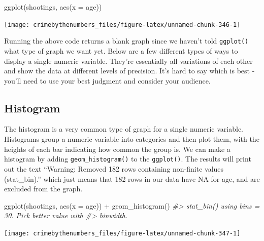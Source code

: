 \documentclass[
]{krantz}
\makeatletter
\newenvironment{Shaded}{\begin{snugshade}}{\end{snugshade}}
\newcommand{\AttributeTok}[1]{\textcolor[rgb]{0.61,0.61,0.61}{#1}}
\newcommand{\CommentTok}[1]{\textcolor[rgb]{0.37,0.37,0.37}{\textit{#1}}}
\newcommand{\FunctionTok}[1]{\textcolor[rgb]{0,0,0}{#1}}
\newcommand{\NormalTok}[1]{#1}
\newcommand{\SpecialCharTok}[1]{\textcolor[rgb]{0,0,0}{#1}}
\newenvironment{kframe}{%
\medskip{}
\setlength{\fboxsep}{.8em}
 \def\at@end@of@kframe{}%
 \ifinner\ifhmode%
  \def\at@end@of@kframe{\end{minipage}}%
  \begin{minipage}{\columnwidth}%
 \fi\fi%
 \def\FrameCommand##1{\hskip\@totalleftmargin \hskip-\fboxsep
 \colorbox{shadecolor}{##1}\hskip-\fboxsep
     \hskip-\linewidth \hskip-\@totalleftmargin \hskip\columnwidth}%
 \MakeFramed {\advance\hsize-\width
   \@totalleftmargin\z@ \linewidth\hsize
   \@setminipage}}%
 {\par\unskip\endMakeFramed%
 \at@end@of@kframe}
\renewenvironment{Shaded}{\begin{kframe}}{\end{kframe}}
\makeatother
\begin{document}
\begin{Shaded}
\begin{Highlighting}[]
\FunctionTok{ggplot}\NormalTok{(shootings, }\FunctionTok{aes}\NormalTok{(}\AttributeTok{x =}\NormalTok{ age))}
\end{Highlighting}
\end{Shaded}

\begin{center}\texttt{[image: crimebythenumbers\_files/figure-latex/unnamed-chunk-346-1]} \end{center}

Running the above code returns a blank graph since we
haven't told \texttt{ggplot()} what type of graph we want
yet. Below are a few different types of ways to display a
single numeric variable. They're essentially all variations
of each other and show the data at different levels of
precision. It's hard to say which is best - you'll need to
use your best judgment and consider your audience.

\hypertarget{histogram}{%
\subsection{Histogram}\label{histogram}}

The histogram is a very common type of graph for a single
numeric variable. Histograms group a numeric variable into
categories and then plot them, with the heights of each bar
indicating how common the group is. We can make a histogram
by adding \texttt{geom\_histogram()} to the
\texttt{ggplot()}. The results will print out the text
``Warning: Removed 182 rows containing non-finite values
(stat\_bin).'' which just means that 182 rows in our data
have NA for age, and are excluded from the graph.

\begin{Shaded}
\begin{Highlighting}[]
\FunctionTok{ggplot}\NormalTok{(shootings, }\FunctionTok{aes}\NormalTok{(}\AttributeTok{x =}\NormalTok{ age)) }\SpecialCharTok{+}
  \FunctionTok{geom\_histogram}\NormalTok{()}
\CommentTok{\#\textgreater{} \textasciigrave{}stat\_bin()\textasciigrave{} using \textasciigrave{}bins = 30\textasciigrave{}. Pick better value with}
\CommentTok{\#\textgreater{} \textasciigrave{}binwidth\textasciigrave{}.}
\end{Highlighting}
\end{Shaded}

\begin{center}\texttt{[image: crimebythenumbers\_files/figure-latex/unnamed-chunk-347-1]} \end{center}
\end{document}
